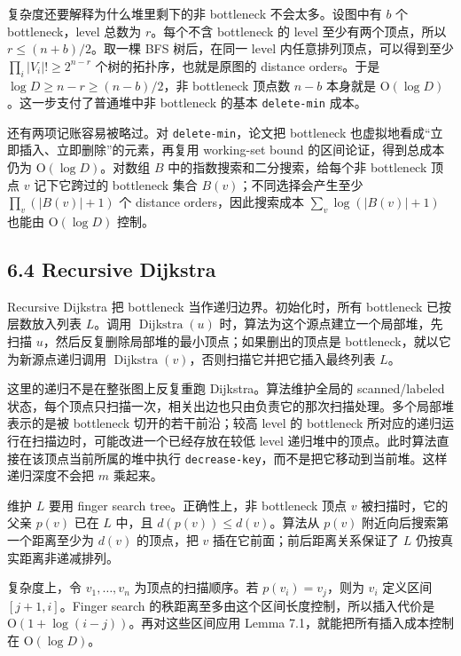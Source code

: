 复杂度还要解释为什么堆里剩下的非 bottleneck 不会太多。设图中有 \(b\) 个 bottleneck，level 总数为 \(r\)。每个不含 bottleneck 的 level 至少有两个顶点，所以 \(r\le (n+b)/2\)。取一棵 BFS 树后，在同一 level 内任意排列顶点，可以得到至少 \(\prod_i |V_i|!\ge 2^{n-r}\) 个树的拓扑序，也就是原图的 distance orders。于是 \(\log D\ge n-r\ge (n-b)/2\)，非 bottleneck 顶点数 \(n-b\) 本身就是 \(\mathrm{O}(\log D)\)。这一步支付了普通堆中非 bottleneck 的基本 \texttt{delete-\allowbreak{}min} 成本。

还有两项记账容易被略过。对 \texttt{delete-\allowbreak{}min}，论文把 bottleneck 也虚拟地看成“立即插入、立即删除”的元素，再复用 working-set bound 的区间论证，得到总成本仍为 \(\mathrm{O}(\log D)\)。对数组 \(B\) 中的指数搜索和二分搜索，给每个非 bottleneck 顶点 \(v\) 记下它跨过的 bottleneck 集合 \(B(v)\)；不同选择会产生至少 \(\prod_v (|B(v)|+1)\) 个 distance orders，因此搜索成本 \(\sum_v \log(|B(v)|+1)\) 也能由 \(\mathrm{O}(\log D)\) 控制。

\subsection*{6.4 Recursive Dijkstra}
Recursive Dijkstra 把 bottleneck 当作递归边界。初始化时，所有 bottleneck 已按层数放入列表 \(L\)。调用 \(\operatorname{Dijkstra}(u)\) 时，算法为这个源点建立一个局部堆，先扫描 \(u\)，然后反复删除局部堆的最小顶点；如果删出的顶点是 bottleneck，就以它为新源点递归调用 \(\operatorname{Dijkstra}(v)\)，否则扫描它并把它插入最终列表 \(L\)。

这里的递归不是在整张图上反复重跑 Dijkstra。算法维护全局的 scanned/\allowbreak{}labeled 状态，每个顶点只扫描一次，相关出边也只由负责它的那次扫描处理。多个局部堆表示的是被 bottleneck 切开的若干前沿；较高 level 的 bottleneck 所对应的递归运行在扫描边时，可能改进一个已经存放在较低 level 递归堆中的顶点。此时算法直接在该顶点当前所属的堆中执行 \texttt{decrease-\allowbreak{}key}，而不是把它移动到当前堆。这样递归深度不会把 \(m\) 乘起来。

维护 \(L\) 要用 finger search tree。正确性上，非 bottleneck 顶点 \(v\) 被扫描时，它的父亲 \(p(v)\) 已在 \(L\) 中，且 \(d(p(v))\le d(v)\)。算法从 \(p(v)\) 附近向后搜索第一个距离至少为 \(d(v)\) 的顶点，把 \(v\) 插在它前面；前后距离关系保证了 \(L\) 仍按真实距离非递减排列。

复杂度上，令 \(v_1,\ldots,v_n\) 为顶点的扫描顺序。若 \(p(v_i)=v_j\)，则为 \(v_i\) 定义区间 \([j+1,i]\)。Finger search 的秩距离至多由这个区间长度控制，所以插入代价是 \(\mathrm{O}(1+\log(i-j))\)。再对这些区间应用 Lemma 7.1，就能把所有插入成本控制在 \(\mathrm{O}(\log D)\)。

